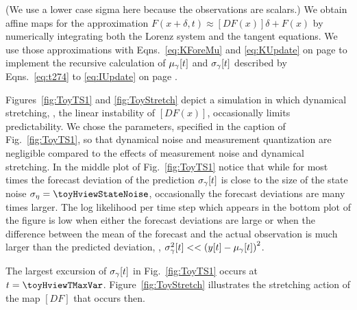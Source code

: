 (We use a lower case sigma here because the observations are scalars.)
We obtain affine maps for the approximation $F(x+\delta,t) \approx
\left[ DF(x)\right]\delta + F(x)$ %
%
by numerically integrating both the Lorenz system and the tangent
equations.  We use those approximations with Eqns.~\eqref{eq:KForeMu}
and \eqref{eq:KUpdate} on page \pageref{eq:KUpdate} to implement the
recursive calculation of ${\mu_\gamma}{[t]}$ and
${\sigma_\gamma}{[t]}$ described by Eqns.~\eqref{eq:t274} to
\eqref{eq:IUpdate} on page \pageref{eq:IUpdate}.

Figures~\ref{fig:ToyTS1} and \ref{fig:ToyStretch} depict a simulation
in which dynamical stretching, \ie, the linear instability of
$\left[ DF(x)\right]$, occasionally limits predictability.  We chose
the parameters, specified in the caption of Fig.~\ref{fig:ToyTS1}, so
that dynamical noise and measurement quantization are negligible
compared to the effects of measurement noise and dynamical stretching.
In the middle plot of Fig.~\ref{fig:ToyTS1} notice that while for most
times the forecast deviation of the prediction ${\sigma_\gamma}{[t]}$
is close to the size of the state noise
$\sigma_\eta = \toyHviewStateNoise$, occasionally the forecast
deviations are many times larger.  The log likelihood per time step
which appears in the bottom plot of the figure is low when either the
forecast deviations are large or when the difference between the mean
of the forecast and the actual observation is much larger than the
predicted deviation, \ie,
${\sigma^2_\gamma}{[t]} <<
\left({y}{[t]}-{\mu_\gamma}{[t]}\right)^2$.

The largest excursion of ${\sigma_\gamma}{[t]}$ in
Fig.~\ref{fig:ToyTS1} occurs at $t=\toyHviewTMaxVar$.
Figure~\ref{fig:ToyStretch} illustrates the stretching action of the
map $[DF]$ that occurs then.

